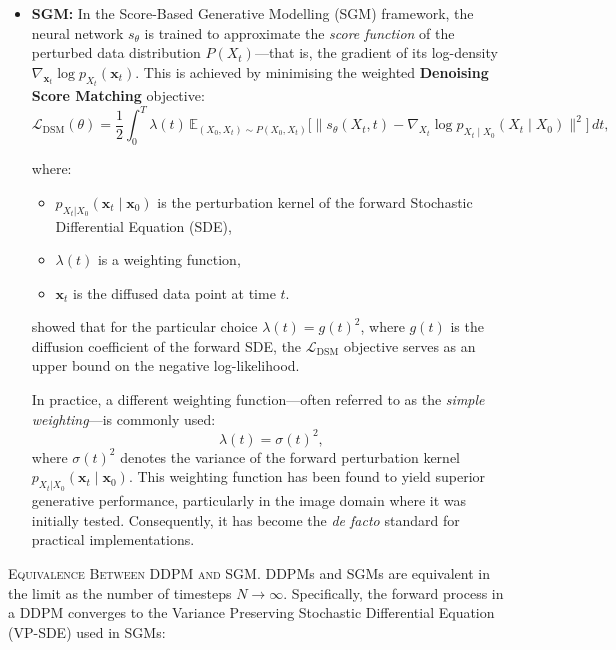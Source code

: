 \begin{itemize}
    \item \textbf{SGM:} In the Score-Based Generative Modelling (SGM) framework, the neural network \(s_\theta\) is trained to approximate the \emph{score function} of the perturbed data distribution \(P(X_t)\)—that is, the gradient of its log-density \(\nabla_{\mathbf{x}_t} \log p_{X_t}(\mathbf{x}_t)\). This is achieved by minimising the weighted \textbf{Denoising Score Matching} objective:
        \[
        \mathcal{L}_{\text{DSM}}(\theta) = \frac{1}{2} \int_0^T \lambda(t) \, \mathbb{E}_{(X_0, X_t) \sim P(X_0, X_t)} \bigl[ \bigl\| s_\theta(X_t, t) - \nabla_{X_t} \log p_{X_t \mid X_0}(X_t \mid X_0) \bigr\|^2 \bigr] \, dt,
        \]

        where:
        \begin{itemize}
            \item \( p_{X_t|X_0}(\mathbf{x}_t \mid \mathbf{x}_0) \) is the perturbation kernel of the forward Stochastic Differential Equation (SDE),
            \item \( \lambda(t) \) is a weighting function,
            \item \( \mathbf{x}_t \) is the diffused data point at time \( t \).
        \end{itemize}

        \citet{song2021maximum} showed that for the particular choice \( \lambda(t) = g(t)^2 \), where \( g(t) \) is the diffusion coefficient of the forward SDE, the \( \mathcal{L}_{\text{DSM}} \) objective serves as an upper bound on the negative log-likelihood.

        In practice, a different weighting function—often referred to as the \emph{simple weighting}—is commonly used:
        \[
        \lambda(t) = \sigma(t)^2,
        \]
        where \( \sigma(t)^2 \) denotes the variance of the forward perturbation kernel \( p_{X_t|X_0}(\mathbf{x}_t \mid \mathbf{x}_0) \). This weighting function has been found to yield superior generative performance, particularly in the image domain where it was initially tested. Consequently, it has become the \emph{de facto} standard for practical implementations.

\end{itemize}

\textsc{Equivalence Between DDPM and SGM.} DDPMs and SGMs are equivalent in the limit as the number of timesteps \( N \to \infty \). Specifically, the forward process in a DDPM converges to the Variance Preserving Stochastic Differential Equation (VP-SDE) used in SGMs:

